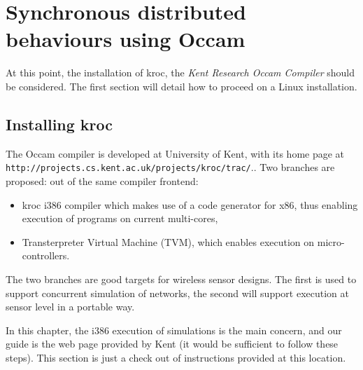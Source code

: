 \documentclass[times,a4paper]{book}
\begin{document}
\chapter {Synchronous distributed  behaviours using Occam}

At this point, the installation of kroc, the {\sl Kent Research Occam Compiler}
should be considered. The first section will detail how to proceed on a Linux
installation.

\section{Installing kroc}

The Occam compiler is developed at University of Kent, with its home page at
{\tt http://projects.cs.kent.ac.uk/projects/kroc/trac/}.. Two branches are proposed:
out of the same compiler frontend:
\begin{itemize}
\item kroc i386 compiler which makes use of a code generator for x86, thus enabling execution
of programs on current multi-cores,
\item Transterpreter Virtual Machine (TVM), which enables execution on micro-controllers.
\end{itemize}

The two branches are good targets for wireless sensor designs. The first is used
to support concurrent simulation of networks, the second will support execution 
at sensor level in a portable way.

In this chapter, the i386 execution of simulations is the main concern, and our guide 
is the web page provided by Kent (it would be sufficient to follow these steps).
This section is just a check out of instructions provided at this location.
\end{document}
